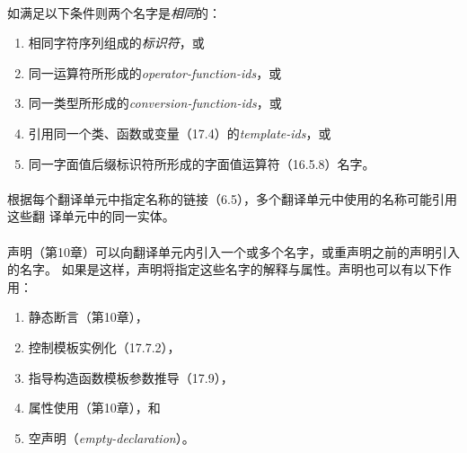 \paragraph{}
如满足以下条件则两个名字是\textit{相同}的：
\begin{enumerate}
  \item{相同字符序列组成的\textit{标识符}，或}
  \item{同一运算符所形成的\textit{operator-function-ids}，或}
  \item{同一类型所形成的\textit{conversion-function-ids}，或}
  \item{引用同一个类、函数或变量（17.4）的\textit{template-ids}，或}
  \item{同一字面值后缀标识符所形成的字面值运算符（16.5.8）名字。}
\end{enumerate}

\paragraph{}
根据每个翻译单元中指定名称的链接（6.5），多个翻译单元中使用的名称可能引用这些翻
译单元中的同一实体。



\paragraph{}
声明（第10章）可以向翻译单元内引入一个或多个名字，或重声明之前的声明引入的名字。
如果是这样，声明将指定这些名字的解释与属性。声明也可以有以下作用：
\begin{enumerate}
  \item{静态断言（第10章），}
  \item{控制模板实例化（17.7.2），}
  \item{指导构造函数模板参数推导（17.9），}
  \item{属性使用（第10章），和}
  \item{空声明（\textit{empty-declaration}）。}
\end{enumerate}

